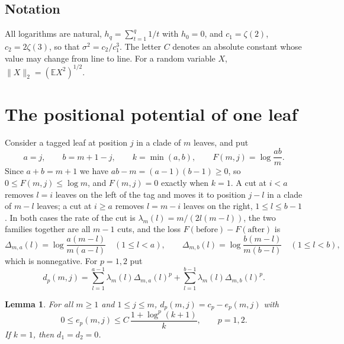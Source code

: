 \documentclass[11pt]{amsart}
\newtheorem{lemma}[theorem]{Lemma}
\theoremstyle{remark}
\numberwithin{equation}{section}
\newcommand{\E}{\mathbb E}
\begin{document}
\subsection*{Notation}
All logarithms are natural, $h_q=\sum_{t=1}^q1/t$ with $h_0=0$, and $c_1=\zeta(2)$, $c_2=2\zeta(3)$, so that $\sigma^2=c_2/c_1^3$. The letter $C$ denotes an absolute constant whose value may change from line to line. For a random variable $X$, $\|X\|_2=(\E X^2)^{1/2}$.

\section{The positional potential of one leaf}\label{sec:potential}

Consider a tagged leaf at position $j$ in a clade of $m$ leaves, and put
\[
a=j,\qquad b=m+1-j,\qquad k=\min(a,b),\qquad F(m,j)=\log\frac{ab}{m}.
\]
Since $a+b=m+1$ we have $ab-m=(a-1)(b-1)\ge0$, so $0\le F(m,j)\le\log m$, and $F(m,j)=0$ exactly when $k=1$. A cut at $i<a$ removes $l=i$ leaves on the left of the tag and moves it to position $j-l$ in a clade of $m-l$ leaves; a cut at $i\ge a$ removes $l=m-i$ leaves on the right, $1\le l\le b-1$. In both cases the rate of the cut is $\lambda_m(l)=m/(2l(m-l))$, the two families together are all $m-1$ cuts, and the loss $F(\text{before})-F(\text{after})$ is
\begin{equation}\label{eq:loss}
\Delta_{m,a}(l)=\log\frac{a(m-l)}{m(a-l)}\quad(1\le l<a),\qquad \Delta_{m,b}(l)=\log\frac{b(m-l)}{m(b-l)}\quad(1\le l<b),
\end{equation}
which is nonnegative. For $p=1,2$ put
\[
d_p(m,j)=\sum_{l=1}^{a-1}\lambda_m(l)\Delta_{m,a}(l)^p+\sum_{l=1}^{b-1}\lambda_m(l)\Delta_{m,b}(l)^p .
\]

\begin{lemma}\label{lem:drift}
For all $m\ge1$ and $1\le j\le m$, $d_p(m,j)=c_p-e_p(m,j)$ with
\[
0\le e_p(m,j)\le C\,\frac{1+\log^p(k+1)}{k},\qquad p=1,2.
\]
If $k=1$, then $d_1=d_2=0$.
\end{lemma}
\end{document}
